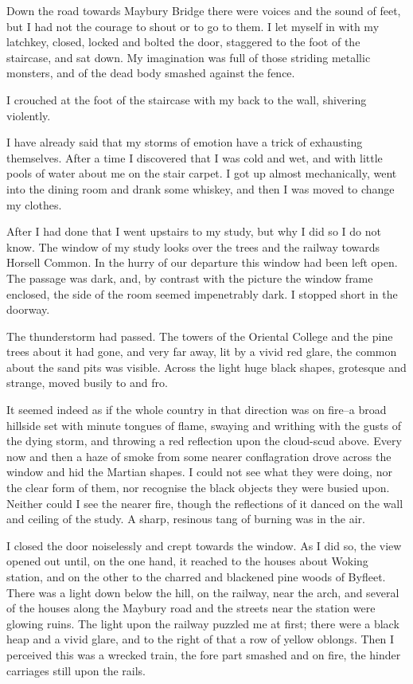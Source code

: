 Down the road towards Maybury Bridge there were voices and the
sound of feet, but I had not the courage to shout or to go to them.
I let myself in with my latchkey, closed, locked and bolted the
door, staggered to the foot of the staircase, and sat down. My
imagination was full of those striding metallic monsters, and of
the dead body smashed against the fence.

I crouched at the foot of the staircase with my back to the wall,
shivering violently.

I have already said that my storms of emotion have a trick of
exhausting themselves. After a time I discovered that I was cold
and wet, and with little pools of water about me on the stair
carpet. I got up almost mechanically, went into the dining room and
drank some whiskey, and then I was moved to change my clothes.

After I had done that I went upstairs to my study, but why I did so
I do not know. The window of my study looks over the trees and the
railway towards Horsell Common. In the hurry of our departure this
window had been left open. The passage was dark, and, by contrast
with the picture the window frame enclosed, the side of the room
seemed impenetrably dark. I stopped short in the doorway.

The thunderstorm had passed. The towers of the Oriental College and
the pine trees about it had gone, and very far away, lit by a vivid
red glare, the common about the sand pits was visible. Across the
light huge black shapes, grotesque and strange, moved busily to and
fro.

It seemed indeed as if the whole country in that direction was on
fire--a broad hillside set with minute tongues of flame, swaying
and writhing with the gusts of the dying storm, and throwing a red
reflection upon the cloud-scud above. Every now and then a haze of
smoke from some nearer conflagration drove across the window and
hid the Martian shapes. I could not see what they were doing, nor
the clear form of them, nor recognise the black objects they were
busied upon. Neither could I see the nearer fire, though the
reflections of it danced on the wall and ceiling of the study. A
sharp, resinous tang of burning was in the air.

I closed the door noiselessly and crept towards the window. As I
did so, the view opened out until, on the one hand, it reached to
the houses about Woking station, and on the other to the charred
and blackened pine woods of Byfleet. There was a light down below
the hill, on the railway, near the arch, and several of the houses
along the Maybury road and the streets near the station were
glowing ruins. The light upon the railway puzzled me at first;
there were a black heap and a vivid glare, and to the right of that
a row of yellow oblongs. Then I perceived this was a wrecked train,
the fore part smashed and on fire, the hinder carriages still upon
the rails.

